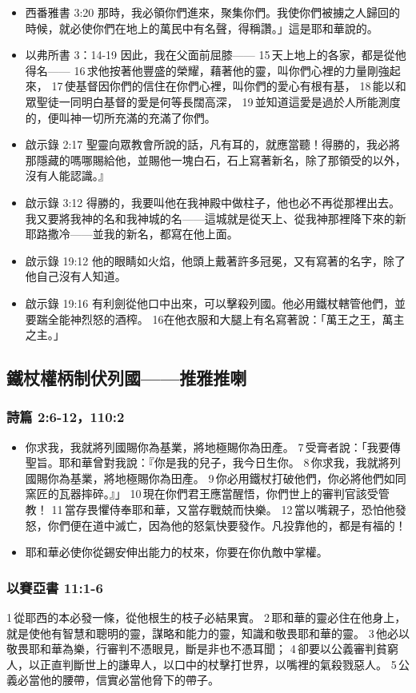 \begin{itemize}
\item 西番雅書 3:20
那時，我必領你們進來，聚集你們。我使你們被擄之人歸回的時候，就必使你們在地上的萬民中有名聲，得稱讚。」這是耶和華說的。
\item 以弗所書 3：14-19
因此，我在父面前屈膝—— 15 天上地上的各家，都是從他得名—— 16 求他按著他豐盛的榮耀，藉著他的靈，叫你們心裡的力量剛強起來， 17 使基督因你們的信住在你們心裡，叫你們的愛心有根有基， 18 能以和眾聖徒一同明白基督的愛是何等長闊高深， 19 並知道這愛是過於人所能測度的，便叫神一切所充滿的充滿了你們。
\item 啟示錄 2:17
聖靈向眾教會所說的話，凡有耳的，就應當聽！得勝的，我必將那隱藏的嗎哪賜給他，並賜他一塊白石，石上寫著新名，除了那領受的以外，沒有人能認識。』
\item 啟示錄 3:12
得勝的，我要叫他在我神殿中做柱子，他也必不再從那裡出去。我又要將我神的名和我神城的名——這城就是從天上、從我神那裡降下來的新耶路撒冷——並我的新名，都寫在他上面。
\item 啟示錄 19:12
他的眼睛如火焰，他頭上戴著許多冠冕，又有寫著的名字，除了他自己沒有人知道。
\item 啟示錄 19:16
有利劍從他口中出來，可以擊殺列國。他必用鐵杖轄管他們，並要踹全能神烈怒的酒榨。 16在他衣服和大腿上有名寫著說：「萬王之王，萬主之主。」
\end{itemize} 

\subsection{鐵杖權柄制伏列國——推雅推喇}
\subsubsection{詩篇 2:6-12，110:2}
\begin{itemize} 
\itemsep-.25em
\item 你求我，我就將列國賜你為基業，將地極賜你為田產。
7 受膏者說：「我要傳聖旨。耶和華曾對我說：『你是我的兒子，我今日生你。
8 你求我，我就將列國賜你為基業，將地極賜你為田產。
9 你必用鐵杖打破他們，你必將他們如同窯匠的瓦器摔碎。』」
10 現在你們君王應當醒悟，你們世上的審判官該受管教！
11 當存畏懼侍奉耶和華，又當存戰兢而快樂。
12 當以嘴親子，恐怕他發怒，你們便在道中滅亡，因為他的怒氣快要發作。凡投靠他的，都是有福的！
\item 耶和華必使你從錫安伸出能力的杖來，你要在你仇敵中掌權。
\end{itemize} 

\subsubsection{以賽亞書 11:1-6}
1 從耶西的本必發一條，從他根生的枝子必結果實。 2 耶和華的靈必住在他身上，就是使他有智慧和聰明的靈，謀略和能力的靈，知識和敬畏耶和華的靈。 3 他必以敬畏耶和華為樂，行審判不憑眼見，斷是非也不憑耳聞； 4 卻要以公義審判貧窮人，以正直判斷世上的謙卑人，以口中的杖擊打世界，以嘴裡的氣殺戮惡人。 5 公義必當他的腰帶，信實必當他脅下的帶子。

